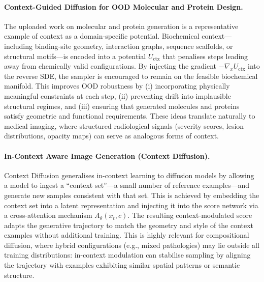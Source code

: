 \paragraph{Context-Guided Diffusion for OOD Molecular and Protein Design.}
The uploaded work on molecular and protein generation is a representative example
of context as a domain-specific potential. Biochemical context---including
binding-site geometry, interaction graphs, sequence scaffolds, or structural
motifs---is encoded into a potential $U_{\mathrm{ctx}}$ that penalises steps
leading away from chemically valid configurations. By injecting the gradient
$-\nabla_x U_{\mathrm{ctx}}$ into the reverse SDE, the sampler is encouraged to
remain on the feasible biochemical manifold. This improves OOD robustness by  
(i) incorporating physically meaningful constraints at each step,
(ii) preventing drift into implausible structural regimes, and  
(iii) ensuring that generated molecules and proteins satisfy geometric and
functional requirements. These ideas translate naturally to medical imaging,
where structured radiological signals (severity scores, lesion distributions,
opacity maps) can serve as analogous forms of context.

\paragraph{In-Context Aware Image Generation (Context Diffusion).}
Context Diffusion generalises in-context learning to diffusion models by
allowing a model to ingest a ``context set''---a small number of reference
examples---and generate new samples consistent with that set. This is achieved
by embedding the context set into a latent representation and injecting it into
the score network via a cross-attention mechanism $A_\theta(x_t,c)$. The
resulting context-modulated score adapts the generative trajectory to match the
geometry and style of the context examples without additional training. This is
highly relevant for compositional diffusion, where hybrid configurations
(e.g., mixed pathologies) may lie outside all training distributions: in-context
modulation can stabilise sampling by aligning the trajectory with examples
exhibiting similar spatial patterns or semantic structure.

